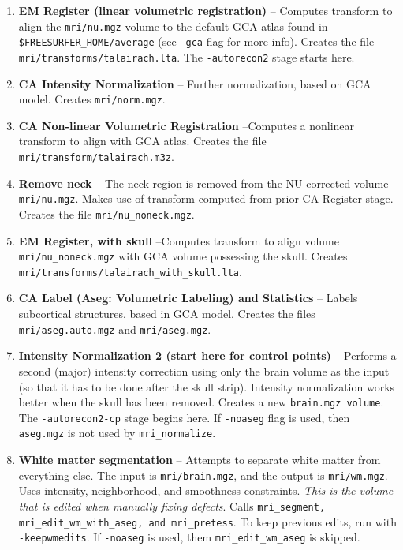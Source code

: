 \documentclass[paper=a4, fontsize=11pt]{scrartcl} %
\numberwithin{equation}{section} %
\numberwithin{figure}{section} %
\numberwithin{table}{section} %
\begin{document}
\begin{enumerate}
    \item  \textbf{EM Register (linear volumetric registration)} -- Computes transform to align the \texttt{mri/nu.mgz} volume to the default GCA atlas found in \texttt{\$FREESURFER\_HOME/average} (see \texttt{-gca} flag for more info). Creates the file \texttt{mri/transforms/talairach.lta}. The \texttt{-autorecon2} stage starts here.
    
    \item  \textbf{CA Intensity Normalization} -- Further normalization, based on GCA model. Creates \texttt{mri/norm.mgz}.

    \item  \textbf{CA Non-linear Volumetric Registration } --Computes a nonlinear transform to align with GCA atlas. Creates the file \texttt{mri/transform/talairach.m3z}.
    
    \item  \textbf{Remove neck} -- The neck region is removed from the NU-corrected volume \texttt{mri/nu.mgz}. Makes use of transform computed from prior CA Register stage. Creates the file \texttt{mri/nu\_noneck.mgz}.
    
    \item \textbf{EM Register, with skull} --Computes transform to align volume \texttt{mri/nu\_noneck.mgz} with GCA volume possessing the skull. Creates \texttt{mri/transforms/talairach\_with\_skull.lta}.
    
    \item \textbf{CA Label (Aseg: Volumetric Labeling) and Statistics} -- Labels subcortical structures, based in GCA model. Creates the files \texttt{mri/aseg.auto.mgz} and \texttt{mri/aseg.mgz}.
    \item \textbf{Intensity Normalization 2 (start here for control points)} -- Performs a second (major) intensity correction using only the brain volume as the input (so that it has to be done after the skull strip). Intensity normalization works better when the skull has been removed. Creates a new \texttt{brain.mgz volume}. The \texttt{-autorecon2-cp} stage begins here. If \texttt{-noaseg} flag is used, then \texttt{aseg.mgz} is not used by \texttt{mri\_normalize}.
    
    \item \textbf{White matter segmentation} -- Attempts to separate white matter from everything else. The input is \texttt{mri/brain.mgz}, and the output is \texttt{mri/wm.mgz}. Uses intensity, neighborhood, and smoothness constraints. \textit{This is the volume that is edited when manually fixing defects}. Calls \texttt{mri\_segment, mri\_edit\_wm\_with\_aseg, and mri\_pretess}. To keep previous edits, run with \texttt{-keepwmedits}. If \texttt{-noaseg} is used, them \texttt{mri\_edit\_wm\_aseg} is skipped.
    

\end{enumerate}
\end{document}
